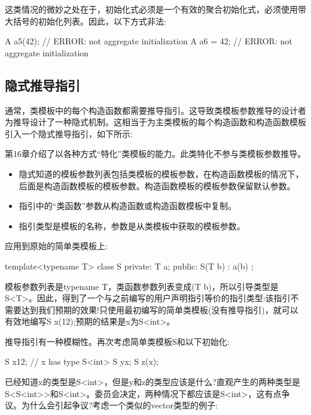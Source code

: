 这类情况的微妙之处在于，初始化式必须是一个有效的聚合初始化式，必须使用带大括号的初始化列表。因此，以下方式非法:

\begin{cpp}
A a5(42); // ERROR: not aggregate initialization
A a6 = 42; // ERROR: not aggregate initialization
\end{cpp}

\subsection{隐式推导指引}

通常，类模板中的每个构造函数都需要推导指引。这导致类模板参数推导的设计者为推导设计了一种隐式机制。这相当于为主类模板的每个构造函数和构造函数模板引入一个隐式推导指引，如下所示:

\begin{notice}
第16章介绍了以各种方式“特化”类模板的能力。此类特化不参与类模板参数推导。
\end{notice}

\begin{itemize}
\item 
隐式知道的模板参数列表包括类模板的模板参数，在构造函数模板的情况下，后面是构造函数模板的模板参数。构造函数模板的模板参数保留默认参数。

\item 
指引中的“类函数”参数从构造函数或构造函数模板中复制。

\item 
指引类型是模板的名称，参数是从类模板中获取的模板参数。
\end{itemize}	

应用到原始的简单类模板上:

\begin{cpp}
template<typename T>
class S {
	private:
	T a;
	public:
	S(T b) : a(b) {
	}
};
\end{cpp}

模板参数列表是typename T，类函数参数列表变成(T b)，所以引导类型是S<T>。因此，得到了一个与之前编写的用户声明指引等价的指引类型:该指引不需要达到我们预期的效果!只使用最初编写的简单类模板(没有推导指引)，就可以有效地编写S x(12);预期的结果是x为S<int>。

推导指引有一种模糊性。再次考虑简单类模板S和以下初始化:

\begin{cpp}
S x{12}; // x has type S<int>
S y{x};
S z(x);
\end{cpp}

已经知道x的类型是S<int>，但是y和z的类型应该是什么?直观产生的两种类型是S<S<int>{}>和S<int>。委员会决定，两种情况下都应该是S<int>，这有点争议。为什么会引起争议?考虑一个类似的vector类型的例子:

